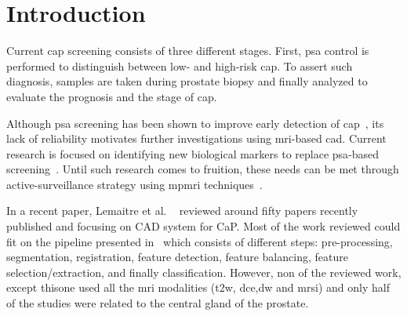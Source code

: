 \section{Introduction}
Current \ac{cap} screening consists of three different stages.
First, \ac{psa} control is performed to distinguish between low- and
high-risk \ac{cap}.
To assert such diagnosis, samples are taken during prostate biopsy and
finally analyzed to evaluate the prognosis and the stage of \ac{cap}.

Although \ac{psa} screening has been shown to improve early detection
of \ac{cap}~\cite{Chou2011}, its lack of reliability motivates further
investigations using \ac{mri}-based \ac{cad}.
Current research is focused on identifying new biological markers to
replace \ac{psa}-based
screening~\cite{Bourdoumis2010,Morgan2011,Brenner2013}.
Until such research comes to fruition, these needs can be met through
active-surveillance strategy using \ac{mpmri}
techniques~\cite{Hoeks2011,Moore2013}.

In a recent paper, Lemaitre et al. ~\cite{Lemaitre2015} reviewed
around fifty papers recently published and focusing on CAD system for
CaP. Most of the work reviewed could fit on the pipeline presented in
~\cite{Lemaitre2016thesis}which consists of  different steps:
pre-processing, segmentation, registration, feature detection, feature
balancing, feature selection/extraction, and finally classification.
However, non of the reviewed work, except thisone used all the
\ac{mri} modalities (\ac{t2w}, \ac{dce},\ac{dw} and \ac{mrsi}) and
only half of the studies were related to the central gland of the
prostate.



